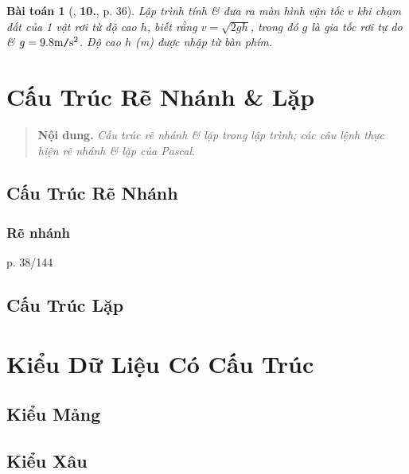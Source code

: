 \documentclass[oneside]{book}
\numberwithin{equation}{section}
\newtheorem{baitoan}{Bài toán}[section]
\begin{document}
\begin{baitoan}[\cite{SGK_Tin_Hoc_11}, \textbf{10.}, p. 36]
	Lập trình tính \& đưa ra màn hình vận tốc $v$ khi chạm đất của 1 vật rơi từ độ cao $h$, biết rằng $v = \sqrt{2gh}$, trong đó $g$ là \emph{gia tốc rơi tự do} \& $g = 9.8{\rm m\texttt{/}s^2}$. Độ cao $h$ (m) được nhập từ bàn phím.
\end{baitoan}


\chapter{Cấu Trúc Rẽ Nhánh \& Lặp}

\begin{quotation}
	\textbf{Nội dung.} \textit{Cấu trúc rẽ nhánh \& lặp trong lập trình; các câu lệnh thực hiện rẽ nhánh \& lặp của Pascal}.
\end{quotation}

\section{Cấu Trúc Rẽ Nhánh}

\subsection{Rẽ nhánh}
p. 38/144


\section{Cấu Trúc Lặp}


\chapter{Kiểu Dữ Liệu Có Cấu Trúc}

\section{Kiểu Mảng}


\section{Kiểu Xâu}
\end{document}
